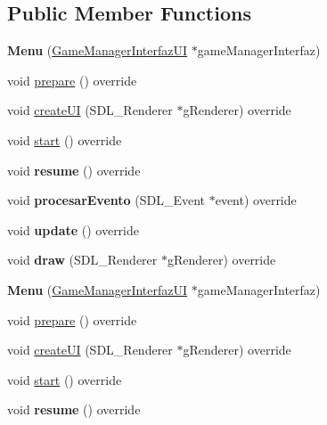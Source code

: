 \subsection*{Public Member Functions}
\begin{DoxyCompactItemize}
\item 
{\bfseries Menu} (\hyperlink{class_game_manager_interfaz_u_i}{Game\+Manager\+Interfaz\+UI} $\ast$game\+Manager\+Interfaz)\hypertarget{class_menu_a965ae68f255ca10ec4ed52c3aa0d9188}{}\label{class_menu_a965ae68f255ca10ec4ed52c3aa0d9188}

\item 
void \hyperlink{class_menu_a12119ab1b9abbc5215f6b80be4e3f94b}{prepare} () override
\item 
void \hyperlink{class_menu_a71c36f40cdf039d07172222f4e1c4566}{create\+UI} (S\+D\+L\+\_\+\+Renderer $\ast$g\+Renderer) override
\item 
void \hyperlink{class_menu_ae3d38e9e9b2bfc6a99810fbd178a9f04}{start} () override
\item 
void {\bfseries resume} () override\hypertarget{class_menu_a59f8f24061a98dab9e3a7068bd89180d}{}\label{class_menu_a59f8f24061a98dab9e3a7068bd89180d}

\item 
void {\bfseries procesar\+Evento} (S\+D\+L\+\_\+\+Event $\ast$event) override\hypertarget{class_menu_a4d582e3e75d272369a97d38dd30b2423}{}\label{class_menu_a4d582e3e75d272369a97d38dd30b2423}

\item 
void {\bfseries update} () override\hypertarget{class_menu_a0878f621aa4501fe0e8f388c2222ead6}{}\label{class_menu_a0878f621aa4501fe0e8f388c2222ead6}

\item 
void {\bfseries draw} (S\+D\+L\+\_\+\+Renderer $\ast$g\+Renderer) override\hypertarget{class_menu_a514595f1b580a1787aa20f37f499e68d}{}\label{class_menu_a514595f1b580a1787aa20f37f499e68d}

\item 
{\bfseries Menu} (\hyperlink{class_game_manager_interfaz_u_i}{Game\+Manager\+Interfaz\+UI} $\ast$game\+Manager\+Interfaz)\hypertarget{class_menu_a965ae68f255ca10ec4ed52c3aa0d9188}{}\label{class_menu_a965ae68f255ca10ec4ed52c3aa0d9188}

\item 
void \hyperlink{class_menu_a12119ab1b9abbc5215f6b80be4e3f94b}{prepare} () override
\item 
void \hyperlink{class_menu_a71c36f40cdf039d07172222f4e1c4566}{create\+UI} (S\+D\+L\+\_\+\+Renderer $\ast$g\+Renderer) override
\item 
void \hyperlink{class_menu_ae3d38e9e9b2bfc6a99810fbd178a9f04}{start} () override
\item 
void {\bfseries resume} () override\hypertarget{class_menu_a59f8f24061a98dab9e3a7068bd89180d}{}\label{class_menu_a59f8f24061a98dab9e3a7068bd89180d}


\end{DoxyCompactItemize}

